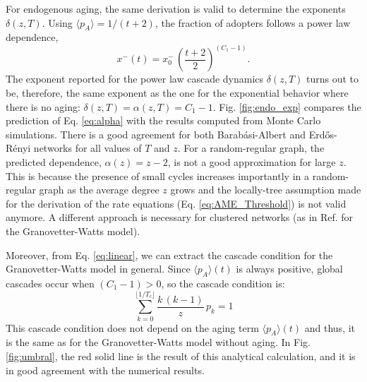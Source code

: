 For endogenous aging, the same derivation is valid to determine the exponents $\delta(z,T)$. Using $\langle p_A \rangle = 1/(t+2)$, the fraction of adopters follows a power law dependence,
\begin{equation}
    \label{rho_endo}
    x^{-}(t) = x^{-}_{0} \, \left( \frac{t+2}{2} \right)^{(C_1 - 1)}.
\end{equation}
The exponent reported for the power law cascade dynamics $\delta(z,T)$ turns out to be, therefore, the same exponent as the one for the exponential behavior where there is no aging:  $\delta(z,T)= \alpha(z,T)= C_{1} - 1$. Fig. \ref{fig:endo_exp} compares the prediction of Eq. \eqref{eq:alpha} with the results computed from Monte Carlo simulations. There is a good agreement for both Barab\'asi-Albert and Erd\H{o}s-R\'enyi networks for all values of $T$ and $z$. For a random-regular graph, the predicted dependence, $\alpha(z) = z - 2$, is not a good approximation for large $z$. This is because the presence of small cycles increases importantly in a random-regular graph as the average degree $z$ grows \cite{wormald_1999} and the locally-tree assumption made for the derivation of the rate equations (Eq. \eqref{eq:AME_Threshold}) is not valid anymore. A different approach is necessary for clustered networks (as in Ref.\cite{Leah2022} for the Granovetter-Watts model). 

Moreover, from Eq. \eqref{eq:linear}, we can extract the cascade condition for the Granovetter-Watts model in general. Since $\langle p_A \rangle(t)$ is always positive, global cascades occur when $(C_1 - 1) > 0 $, so the cascade condition is:
\begin{equation}
    \label{eq:umbral}
    \sum_{k=0}^{\lfloor 1/T_c \rfloor} \frac{k \, (k - 1)}{z}\, p_k = 1
\end{equation}
This cascade condition does not depend on the aging term $\langle p_A \rangle(t)$ and thus, it is the same as for the Granovetter-Watts model without aging. In Fig. \ref{fig:umbral}, the red solid line is the result of this analytical calculation, and it is in good agreement with the numerical results. 

